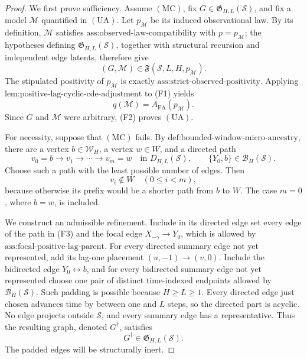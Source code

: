 \documentclass{article}
\begin{document}
\begin{proof}
We first prove sufficiency.  Assume \(\mathrm{(MC)}\), fix \(G\in\mathfrak G_{H,L}(\mathcal S)\), and fix a model \(\mathcal M\) quantified in \(\mathrm{(UA)}\).  Let \(p_{\mathcal M}\) be its induced observational law.  By its definition, \(\mathcal M\) satisfies \(\text{ass:observed-law-compatibility}\) with \(p=p_{\mathcal M}\); the hypotheses defining \(\mathfrak G_{H,L}(\mathcal S)\), together with structural recursion and independent edge latents, therefore give
\[
(G,\mathcal M)\in\mathfrak F(\mathcal S,L,H,p_{\mathcal M}).
\tag{F1}
\]
The stipulated positivity of \(p_{\mathcal M}\) is exactly \(\text{ass:strict-observed-positivity}\).  Applying \(\text{lem:positive-lag-cyclic-cde-adjustment}\) to (F1) yields
\[
q(\mathcal M)=A_{\mathrm{FA}}(p_{\mathcal M}).
\tag{F2}
\]
Since \(G\) and \(\mathcal M\) were arbitrary, (F2) proves \(\mathrm{(UA)}\).

For necessity, suppose that \(\mathrm{(MC)}\) fails.  By \(\text{def:bounded-window-micro-ancestry}\), there are a vertex \(b\in\mathcal W_H\), a vertex \(w\in W\), and a directed path
\[
v_0=b\to v_1\to\cdots\to v_m=w
\quad\text{in }D_{H,L}(\mathcal S),
\qquad
\{Y_0,b\}\in\mathcal B_H(\mathcal S).
\tag{F3}
\]
Choose such a path with the least possible number of edges.  Then
\[
v_i\notin W\quad(0\le i<m),
\tag{F4}
\]
because otherwise its prefix would be a shorter path from \(b\) to \(W\).  The case \(m=0\), where \(b=w\), is included.

We construct an admissible refinement.  Include in its directed edge set every edge of the path in (F3) and the focal edge \(X_{-\gamma}\to Y_0\), which is allowed by \(\text{ass:focal-positive-lag-parent}\).  For every directed summary edge not yet represented, add its lag-one placement \((u,-1)\to(v,0)\).  Include the bidirected edge \(Y_0\leftrightarrow b\), and for every bidirected summary edge not yet represented choose one pair of distinct time-indexed endpoints allowed by \(\mathcal B_H(\mathcal S)\).  Such padding is possible because \(H\ge L\ge1\).  Every directed edge just chosen advances time by between one and \(L\) steps, so the directed part is acyclic.  No edge projects outside \(\mathcal S\), and every summary edge has a representative.  Thus the resulting graph, denoted \(G^{\dagger}\), satisfies
\[
G^{\dagger}\in\mathfrak G_{H,L}(\mathcal S).
\tag{F5}
\]
The padded edges will be structurally inert.


\end{proof}
\end{document}

